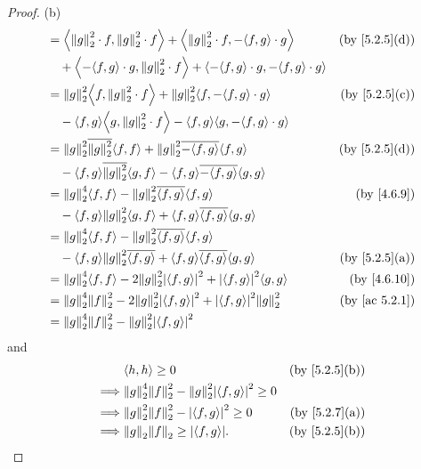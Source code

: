 \begin{proof}{(b)}
\begin{align*}
     & = \inner*{\norm*{g}_2^2 \cdot f, \norm*{g}_2^2 \cdot f} + \inner*{\norm*{g}_2^2 \cdot f, -\inner*{f, g} \cdot g}         & \text{(by \cref{5.2.5}(d))} \\
     & \quad + \inner*{-\inner*{f, g} \cdot g, \norm*{g}_2^2 \cdot f} + \inner*{-\inner*{f, g} \cdot g, -\inner*{f, g} \cdot g}                               \\
     & = \norm*{g}_2^2 \inner*{f, \norm*{g}_2^2 \cdot f} + \norm*{g}_2^2 \inner*{f, -\inner*{f, g} \cdot g}                     & \text{(by \cref{5.2.5}(c))} \\
     & \quad - \inner*{f, g} \inner*{g, \norm*{g}_2^2 \cdot f} - \inner*{f, g} \inner*{g, -\inner*{f, g} \cdot g}                                             \\
     & = \norm*{g}_2^2 \overline{\norm*{g}_2^2} \inner*{f, f} + \norm*{g}_2^2 \overline{-\inner*{f, g}} \inner*{f, g}           & \text{(by \cref{5.2.5}(d))} \\
     & \quad - \inner*{f, g} \overline{\norm*{g}_2^2} \inner*{g, f} - \inner*{f, g} \overline{-\inner*{f, g}} \inner*{g, g}                                   \\
     & = \norm*{g}_2^4 \inner*{f, f} - \norm*{g}_2^2 \overline{\inner*{f, g}} \inner*{f, g}                                     & \text{(by \cref{4.6.9})}    \\
     & \quad - \inner*{f, g} \norm*{g}_2^2 \inner*{g, f} + \inner*{f, g} \overline{\inner*{f, g}} \inner*{g, g}                                               \\
     & = \norm*{g}_2^4 \inner*{f, f} - \norm*{g}_2^2 \overline{\inner*{f, g}} \inner*{f, g}                                                                   \\
     & \quad - \inner*{f, g} \norm*{g}_2^2 \overline{\inner*{f, g}} + \inner*{f, g} \overline{\inner*{f, g}} \inner*{g, g}      & \text{(by \cref{5.2.5}(a))} \\
     & = \norm*{g}_2^4 \inner*{f, f} - 2 \norm*{g}_2^2 \abs{\inner*{f, g}}^2 + \abs{\inner*{f, g}}^2 \inner*{g, g}              & \text{(by \cref{4.6.10})}   \\
     & = \norm*{g}_2^4 \norm*{f}_2^2 - 2 \norm*{g}_2^2 \abs{\inner*{f, g}}^2 + \abs{\inner*{f, g}}^2 \norm*{g}_2^2              & \text{(by \cref{ac 5.2.1})} \\
     & = \norm*{g}_2^4 \norm*{f}_2^2 - \norm*{g}_2^2 \abs{\inner*{f, g}}^2
  \end{align*}
  and
  \begin{align*}
             & \inner*{h, h} \geq 0                                                     & \text{(by \cref{5.2.5}(b))} \\
    \implies & \norm*{g}_2^4 \norm*{f}_2^2 - \norm*{g}_2^2 \abs{\inner*{f, g}}^2 \geq 0                               \\
    \implies & \norm*{g}_2^2 \norm*{f}_2^2 - \abs{\inner*{f, g}}^2 \geq 0               & \text{(by \cref{5.2.7}(a))} \\
    \implies & \norm*{g}_2 \norm*{f}_2 \geq \abs{\inner*{f, g}}.                        & \text{(by \cref{5.2.5}(b))}
  \end{align*}
\end{proof}

